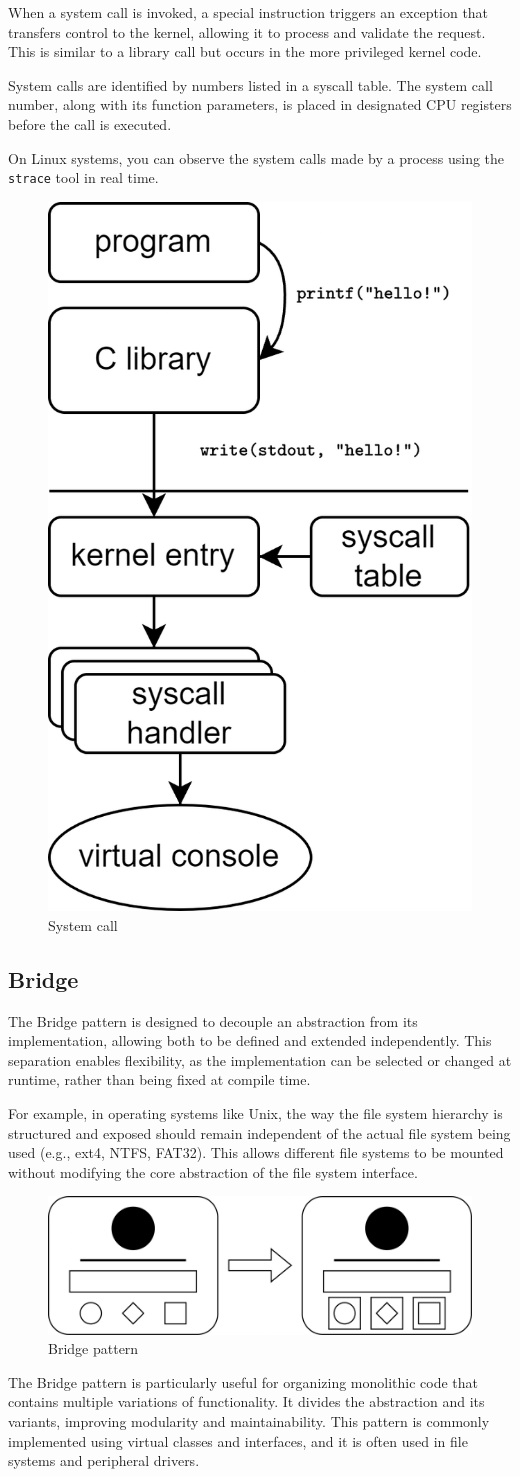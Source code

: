 When a system call is invoked, a special instruction triggers an exception that transfers control to the kernel, allowing it to process and validate the request. 
This is similar to a library call but occurs in the more privileged kernel code.

System calls are identified by numbers listed in a syscall table. 
The system call number, along with its function parameters, is placed in designated CPU registers before the call is executed.

On Linux systems, you can observe the system calls made by a process using the \texttt{strace} tool in real time.
\begin{figure}[H]
    \centering
    \includegraphics[width=0.3\linewidth]{images/syscall.png}
    \caption{System call}
\end{figure}

\subsection{Bridge}
The Bridge pattern is designed to decouple an abstraction from its implementation, allowing both to be defined and extended independently. 
This separation enables flexibility, as the implementation can be selected or changed at runtime, rather than being fixed at compile time.

For example, in operating systems like Unix, the way the file system hierarchy is structured and exposed should remain independent of the actual file system being used (e.g., ext4, NTFS, FAT32). 
This allows different file systems to be mounted without modifying the core abstraction of the file system interface.
\begin{figure}[H]
    \centering
    \includegraphics[width=0.75\linewidth]{images/bridge.png}
    \caption{Bridge pattern}
\end{figure}
The Bridge pattern is particularly useful for organizing monolithic code that contains multiple variations of functionality. 
It divides the abstraction and its variants, improving modularity and maintainability. 
This pattern is commonly implemented using virtual classes and interfaces, and it is often used in file systems and peripheral drivers.

